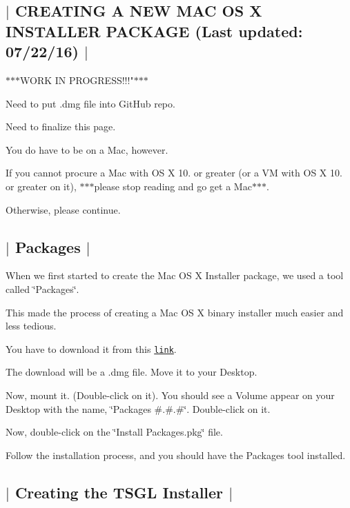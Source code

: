 

 \subsection*{$\vert$ C\-R\-E\-A\-T\-I\-N\-G A N\-E\-W M\-A\-C O\-S X I\-N\-S\-T\-A\-L\-L\-E\-R P\-A\-C\-K\-A\-G\-E (Last updated\-: 07/22/16) $\vert$ }

$\ast$$\ast$$\ast$\-W\-O\-R\-K I\-N P\-R\-O\-G\-R\-E\-S\-S!!!"$\ast$$\ast$$\ast$


\begin{DoxyItemize}
\item Need to put .dmg file into Git\-Hub repo.
\item Need to finalize this page.
\end{DoxyItemize}

You do have to be on a Mac, however.

If you cannot procure a Mac with O\-S X 10. or greater (or a V\-M with O\-S X 10. or greater on it), $\ast$$\ast$$\ast$please stop reading and go get a Mac$\ast$$\ast$$\ast$.

Otherwise, please continue. 

 \subsection*{$\vert$ Packages $\vert$ }

When we first started to create the Mac O\-S X Installer package, we used a tool called \char`\"{}\-Packages\char`\"{}.

This made the process of creating a Mac O\-S X binary installer much easier and less tedious.

You have to download it from this \href{http://s.sudre.free.fr/Software/Packages/about.html}{\tt link}.

The download will be a .dmg file. Move it to your Desktop.

Now, mount it. (Double-\/click on it). You should see a Volume appear on your Desktop with the name, \char`\"{}\-Packages \#.\#.\#\char`\"{}. Double-\/click on it.

Now, double-\/click on the \char`\"{}\-Install Packages.\-pkg\char`\"{} file.

Follow the installation process, and you should have the Packages tool installed. 

 \subsection*{$\vert$ Creating the T\-S\-G\-L Installer $\vert$ }

